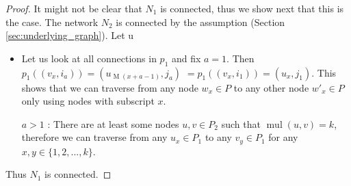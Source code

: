 \begin{proof}
    It might not be clear that $N_1$ is connected, thus we show next that this is the case.
    The network $N_2$ is connected by the assumption (Section \ref{sec:underlying_graph}).
    Let u
    \begin{itemize}
        \item Let us look at all connections in $p_1$ and fix $a=1$.
        Then $p_1((v_{x}, i_a)) = (u_{\operatorname{M}(x+a-1)}, j_a)$
        $=p_1((v_{x}, i_1)) = (u_{x}, j_1)$.
        This shows that we can traverse from any node $w_x\in P$ to any other node $w'_x\in P$ only using nodes with subscript $x$.
        \item[$a>1$]:
        There are at least some nodes $u, v \in P_2$ such that $\operatorname{mul}(u,v) = k$, therefore we can traverse from any $u_x \in P_1$ to any $v_y \in P_1$ for any $x, y \in \{1, 2, ..., k\}$.
    \end{itemize}
    Thus $N_1$ is connected.
\end{proof}


